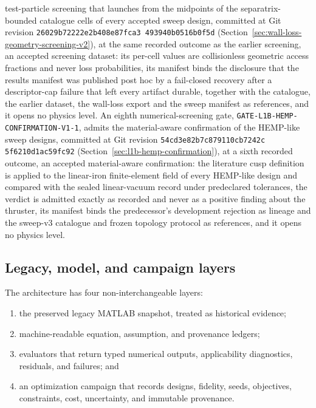\documentclass[11pt]{article}
\newcommand{\GeometryScreeningTwoEvidenceRevision}{\texttt{26029b72\allowbreak{}222e2b40\allowbreak{}8e87fca3\allowbreak{}%
493940b0\allowbreak{}516b0f5d}}
\newcommand{\HempConfirmationEvidenceRevision}{\texttt{54cd3e82\allowbreak{}b7c87911\allowbreak{}0cb7242c\allowbreak{}%
5f6210d1\allowbreak{}ac59fc92}}
\begin{document}
test-particle screening that launches from the midpoints of the separatrix-bounded
catalogue cells of every accepted sweep design, committed at Git revision
\GeometryScreeningTwoEvidenceRevision{}
(Section~\ref{sec:wall-loss-geometry-screening-v2}), at the same recorded outcome
as the earlier screening, an accepted screening dataset: its per-cell values are
collisionless geometric access fractions and never loss probabilities, its manifest
binds the disclosure that the results manifest was published post hoc by a
fail-closed recovery after a descriptor-cap failure that left every artifact
durable, together with the catalogue, the earlier dataset, the wall-loss export and
the sweep manifest as references, and it opens no physics level. An eighth
numerical-screening gate, \texttt{GATE-L1B-HEMP-CONFIRMATION-V1-1}, admits the
material-aware confirmation of the HEMP-like sweep designs, committed at Git
revision \HempConfirmationEvidenceRevision{}
(Section~\ref{sec:l1b-hemp-confirmation}), at a sixth recorded outcome, an
accepted material-aware confirmation: the literature cusp definition is applied to
the linear-iron finite-element field of every HEMP-like design and compared with
the sealed linear-vacuum record under predeclared tolerances, the verdict is
admitted exactly as recorded and never as a positive finding about the thruster,
its manifest binds the predecessor's development rejection as lineage and the
sweep-v3 catalogue and frozen topology protocol as references, and it opens no
physics level.

\subsection{Legacy, model, and campaign layers}

The architecture has four non-interchangeable layers:
\begin{enumerate}
  \item the preserved legacy MATLAB snapshot, treated as historical evidence;
  \item machine-readable equation, assumption, and provenance ledgers;
  \item evaluators that return typed numerical outputs, applicability
        diagnostics, residuals, and failures; and
  \item an optimization campaign that records designs, fidelity, seeds,
        objectives, constraints, cost, uncertainty, and immutable provenance.
\end{enumerate}
\end{document}
